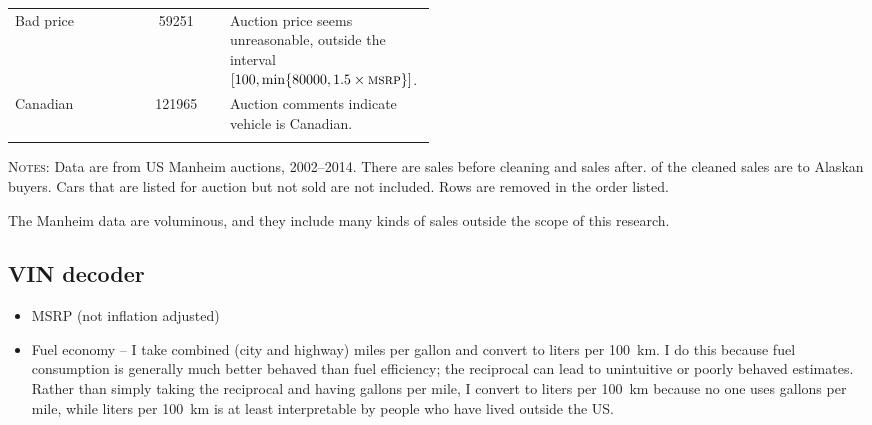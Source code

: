 \documentclass[11pt,letterpaper,oneside]{article}
\newcommand{\snippet}[1]{\hspace{-0.15em}}
\begin{document}
\begin{doublespacing}
\begin{table}[hbt]
\begin{tabular}{l S p{0.493\linewidth}}
	\addlinespace

    Bad price &
    59251
    & Auction price seems unreasonable, outside the interval $[100, \min\{80000, 1.5\times \textsc{msrp} \}]$.\\

	\addlinespace

    Canadian &
    121965
    & Auction comments indicate vehicle is Canadian.\\
    \bottomrule
    \addlinespace
\end{tabular}
\footnotesize
\textsc{Notes:} Data are from US Manheim auctions, 2002--2014.
There are \snippet{auctions_uncleaned_total_obs_count.tex} sales before cleaning and \snippet{auctions_cleaned_total_obs_count.tex} sales after.
\snippet{auctions_cleaned_alaska_obs_count.tex} of the cleaned sales are to Alaskan buyers.
Cars that are listed for auction but not sold are not included.
Rows are removed in the order listed.

\end{table}

The Manheim data are voluminous, and they include many kinds of sales outside the scope of this research.

\subsection{VIN decoder}
\begin{itemize}
    \item MSRP (not inflation adjusted)
    \item Fuel economy -- I take combined (city and highway) miles per gallon and convert to liters per 100~km.
    I do this because fuel consumption is generally much better behaved than fuel efficiency; the reciprocal can lead to unintuitive or poorly behaved estimates.
    Rather than simply taking the reciprocal and having gallons per mile, I convert to liters per 100~km because no one uses gallons per mile, while liters per 100~km is at least interpretable by people who have lived outside the US\@.
\end{itemize}



\end{doublespacing}
\end{document}
